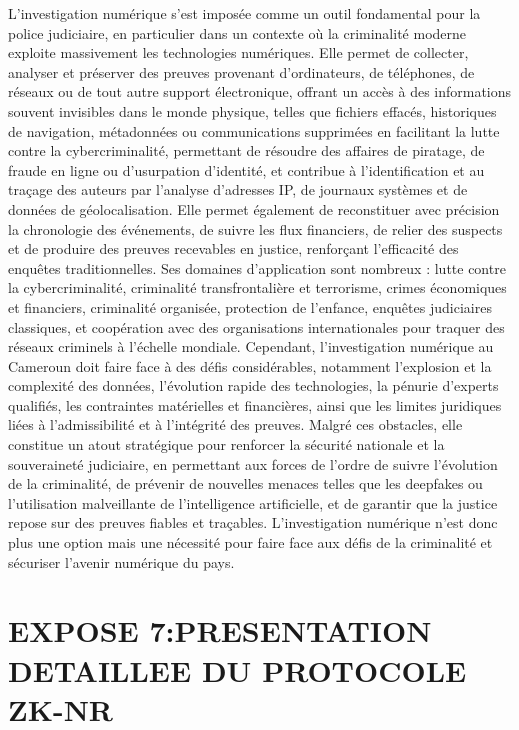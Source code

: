 \documentclass[12pt,a4paper]{report}
\begin{document}
{	
	L’investigation numérique s’est imposée comme un outil fondamental pour la police judiciaire, en particulier dans un contexte où la criminalité moderne exploite massivement les technologies numériques. Elle permet de collecter, analyser et préserver des preuves provenant d’ordinateurs, de téléphones, de réseaux ou de tout autre support électronique, offrant un accès à des informations souvent invisibles dans le monde physique, telles que fichiers effacés, historiques de navigation, métadonnées ou communications supprimées en facilitant la lutte contre la cybercriminalité, permettant de résoudre des affaires de piratage, de fraude en ligne ou d’usurpation d’identité, et contribue à l’identification et au traçage des auteurs par l’analyse d’adresses IP, de journaux systèmes et de données de géolocalisation. Elle permet également de reconstituer avec précision la chronologie des événements, de suivre les flux financiers, de relier des suspects et de produire des preuves recevables en justice, renforçant l’efficacité des enquêtes traditionnelles. Ses domaines d’application sont nombreux : lutte contre la cybercriminalité, criminalité transfrontalière et terrorisme, crimes économiques et financiers, criminalité organisée, protection de l’enfance, enquêtes judiciaires classiques, et coopération avec des organisations internationales pour traquer des réseaux criminels à l’échelle mondiale. Cependant, l’investigation numérique au Cameroun doit faire face à des défis considérables, notamment l’explosion et la complexité des données, l’évolution rapide des technologies, la pénurie d’experts qualifiés, les contraintes matérielles et financières, ainsi que les limites juridiques liées à l’admissibilité et à l’intégrité des preuves. Malgré ces obstacles, elle constitue un atout stratégique pour renforcer la sécurité nationale et la souveraineté judiciaire, en permettant aux forces de l’ordre de suivre l’évolution de la criminalité, de prévenir de nouvelles menaces telles que les deepfakes ou l’utilisation malveillante de l’intelligence artificielle, et de garantir que la justice repose sur des preuves fiables et traçables. L’investigation numérique n’est donc plus une option mais une nécessité pour faire face aux défis de la criminalité et sécuriser l’avenir numérique du pays.
	
  \section*{EXPOSE 7:PRESENTATION DETAILLEE DU PROTOCOLE ZK-NR}\
  
}
\end{document}
